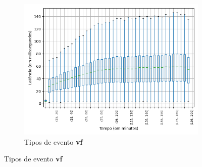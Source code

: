 \begin{figure}
\centering
\begin{subfigure}{.5\textwidth}
\centering
\includegraphics[width=\textwidth]{figuras/graphics/boxplot_9-dez-is_vf.png}
\caption{Tipos de evento \textbf{vf}}
\label{fig:BoxPlot_vf_9-dez-is}
\end{subfigure}%


\end{figure}
